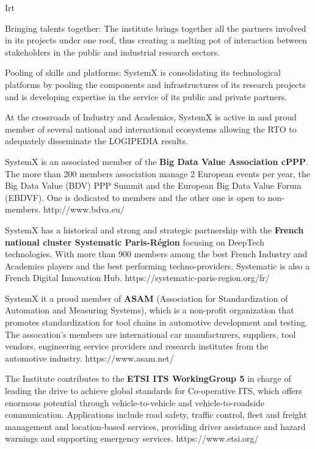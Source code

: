 \begin{sitedescription}{Irt}
\begin{compactitem}
\item Bringing talents together: The institute brings together all the partners involved in its projects under one roof, thus creating a melting pot of interaction between stakeholders in the public and industrial research sectors.
\item Pooling of skills and platforms: SystemX is consolidating its technological platforms by pooling the components and infrastructures of its research projects and is developing expertise in the service of its public and private partners.
\end{compactitem}

At the crossroads of Industry and Academics, SystemX is active in and proud member of several national and international ecosystems allowing the RTO to adequately disseminate the LOGIPEDIA results.

SystemX is an associated member of the {\bf Big Data Value Association cPPP}. The more than 200 members association manage 2 European events per year, the Big Data Value (BDV) PPP Summit and the European Big Data Value Forum (EBDVF). One is dedicated to members and the other one is open to non-members. http://www.bdva.eu/

SystemX has a historical and strong and strategic partnership with the {\bf French national cluster Systematic Paris-Région} focusing on DeepTech technologies. With more than 900 members among the best French Industry and Academics players and the best performing techno-providers. Systematic is also a French Digital Innovation Hub. https://systematic-paris-region.org/fr/

SystemX it a proud member of {\bf ASAM} (Association for Standardization of Automation and Measuring Systems), which is a non-profit organization that promotes standardization for tool chains in automotive development and testing. The assocation’s members are international car manufacturers, suppliers, tool vendors, engineering service providers and research institutes from the automotive industry. https://www.asam.net/

The Institute contributes to the {\bf ETSI ITS WorkingGroup 5} in charge of leading the drive to achieve global standards for Co-operative ITS, which offers enormous potential through vehicle-to-vehicle and vehicle-to-roadside communication. Applications include road safety, traffic control, fleet and freight management and location-based services, providing driver assistance and hazard warnings and supporting emergency services. https://www.etsi.org/


\end{sitedescription}
